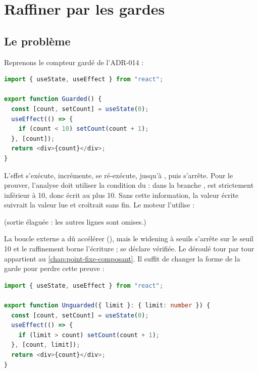 \section{Raffiner par les gardes}
\label{sec:cfg-analyzer-dominance-gardes}

\subsection{Le problème}

Reprenons le compteur gardé de l'ADR-014 :

\begin{lstlisting}[language=TypeScript,caption={Un compteur gardé (\file{/tmp/ch12/guarded.tsx})},label={lst:cfg-analyzer-dominance-guarded}]
import { useState, useEffect } from "react";

export function Guarded() {
  const [count, setCount] = useState(0);
  useEffect(() => {
    if (count < 10) setCount(count + 1);
  }, [count]);
  return <div>{count}</div>;
}
\end{lstlisting}

L'effet s'exécute, incrémente, se ré-exécute, jusqu'à , puis
s'arrête. Pour le prouver, l'analyse doit utiliser la condition du  :
dans la branche ,  est strictement inférieur à 10, donc
 écrit au plus 10. Sans cette information, la valeur écrite
suivrait la valeur lue et croîtrait sans fin. Le moteur l'utilise :

\noindent(sortie élaguée : les autres lignes  sont omises.)

La boucle externe a dû accélérer (), mais le widening à
seuils s'arrête sur le seuil 10 et le raffinement borne l'écriture ;
 se déclare vérifiée. Le déroulé tour par tour appartient
au \cref{chap:point-fixe-composant}. Il suffit de changer la forme de la garde
pour perdre cette preuve :

\begin{lstlisting}[language=TypeScript,caption={La même garde, écrite \code{limit > count} (\file{/tmp/ch12/unguarded.tsx})},label={lst:cfg-analyzer-dominance-unguarded}]
import { useState, useEffect } from "react";

export function Unguarded({ limit }: { limit: number }) {
  const [count, setCount] = useState(0);
  useEffect(() => {
    if (limit > count) setCount(count + 1);
  }, [count, limit]);
  return <div>{count}</div>;
}
\end{lstlisting}

